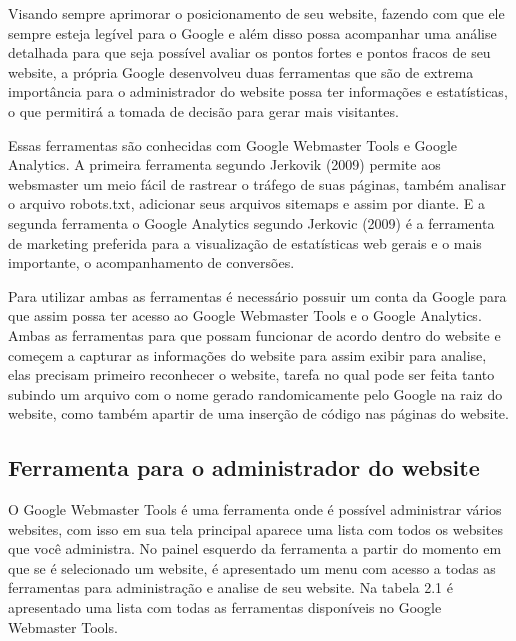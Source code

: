 \documentclass[
	12pt,				%
	openright,			%
	twoside,			%
	a4paper,			%
	english,			%
	french,				%
	spanish,			%
	brazil				%
	]{abntex2}
\begin{document}
Visando sempre aprimorar o posicionamento de seu website, fazendo com que ele sempre esteja legível para o Google e além disso possa acompanhar uma análise detalhada para que seja possível avaliar os pontos fortes e pontos fracos de seu website, a própria Google desenvolveu duas ferramentas que são de extrema importância para o administrador do website possa ter informações e estatísticas, o que permitirá a tomada de decisão para gerar mais visitantes.

Essas ferramentas são conhecidas com Google Webmaster Tools e Google Analytics. A primeira ferramenta segundo Jerkovik (2009) permite aos websmaster um meio fácil de rastrear o tráfego de suas páginas, também analisar o arquivo robots.txt, adicionar seus arquivos sitemaps e assim por diante. E a segunda ferramenta o Google Analytics segundo Jerkovic (2009) é a ferramenta de marketing preferida para a visualização de estatísticas web gerais e o mais importante, o acompanhamento de conversões.

Para utilizar ambas as ferramentas é necessário possuir um conta da Google para que assim possa ter acesso ao Google Webmaster Tools e o Google Analytics. Ambas as ferramentas para que possam funcionar de acordo dentro do website e começem a capturar as informações do website para assim exibir para analise, elas precisam primeiro reconhecer o website, tarefa no qual pode ser feita tanto subindo um arquivo com o nome gerado randomicamente pelo Google na raiz do website, como também apartir de uma inserção de código nas páginas do website.

\subsection{Ferramenta para o administrador do website}

O Google Webmaster Tools é uma ferramenta onde é possível administrar vários websites, com isso em sua tela principal aparece uma lista com todos os websites que você administra. No painel esquerdo da ferramenta a partir do momento em que se é selecionado um website, é apresentado um menu com acesso a todas as ferramentas para administração e analise de seu website. Na tabela 2.1 é apresentado uma lista com todas as ferramentas disponíveis no Google Webmaster Tools.
\end{document}
